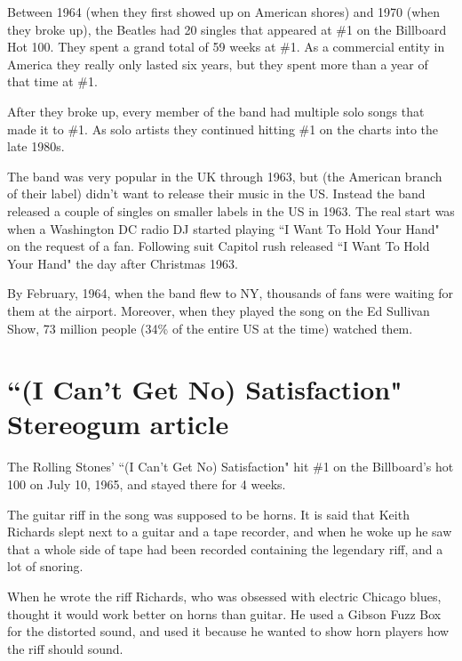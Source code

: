 \documentclass[12pt, a4paper, twoside, openright, titlepage]{book}
\begin{document}
Between 1964 (when they first showed up on American shores) and 1970 (when they broke up), the Beatles had 20 singles that appeared at \#1 on the Billboard Hot 100. They spent a grand total of 59 weeks at \#1. As a commercial entity in America they really only lasted six years, but they spent more than a year of that time at \#1.

After they broke up, every member of the band had multiple solo songs that made it to \#1. As solo artists they continued hitting \#1 on the charts into the late 1980s.


\begin{rmk}{}{}
    The band was very popular in the UK through 1963, but  (the American branch of their label) didn't want to release their music in the US. Instead the band released a couple of singles on smaller labels in the US in 1963. The real start was when a Washington DC radio DJ started playing ``I Want To Hold Your Hand" on the request of a fan. Following suit Capitol rush released ``I Want To Hold Your Hand" the day after Christmas 1963.
\end{rmk}


By February, 1964, when the band flew to NY, thousands of fans were waiting for them at the airport. Moreover, when they played the song on the Ed Sullivan Show, 73 million people (34\% of the entire US at the time) watched them.



\section{``(I Can't Get No) Satisfaction" Stereogum article}

The Rolling Stones' ``(I Can't Get No) Satisfaction" hit \#1 on the Billboard's hot 100 on July 10, 1965, and stayed there for 4 weeks.

\begin{note}{}{}
    The guitar riff in the song was supposed to be horns. It is said that Keith Richards slept next to a guitar and a tape recorder, and when he woke up he saw that a whole side of tape had been recorded containing the legendary riff, and a lot of snoring.
\end{note}

When he wrote the riff Richards, who was obsessed with electric Chicago blues, thought it would work better on horns than guitar. He used a Gibson Fuzz Box for the distorted sound, and used it because he wanted to show horn players how the riff should sound.
\end{document}
